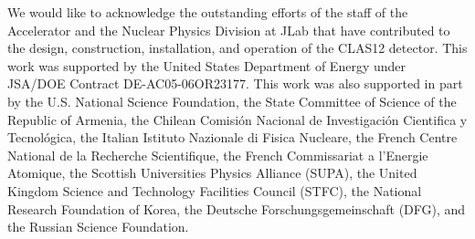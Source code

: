 \documentclass[final,3p,twocolumn]{elsarticle}
\begin{document}
\vspace{0.5cm}


\vspace{0.3cm}

We would like to acknowledge the outstanding efforts of the staff of the Accelerator and the Nuclear Physics
Division at JLab that have contributed to the design, construction, installation, and operation of the CLAS12
detector. This work was supported by the United States Department of Energy under JSA/DOE Contract
DE-AC05-06OR23177. This work was also supported in part by the U.S. National Science Foundation, the State
Committee of Science of the Republic of Armenia, the Chilean Comisi\'on Nacional de Investigaci\'on Cientifica y
Tecnol\'ogica, the Italian Istituto Nazionale di Fisica Nucleare, the French Centre National de la Recherche
Scientifique, the French Commissariat a l'Energie Atomique, the Scottish Universities Physics Alliance (SUPA),
the United Kingdom Science and Technology Facilities Council (STFC), the National Research Foundation of Korea,
the Deutsche Forschungsgemeinschaft (DFG), and the Russian Science Foundation. 
\end{document}
